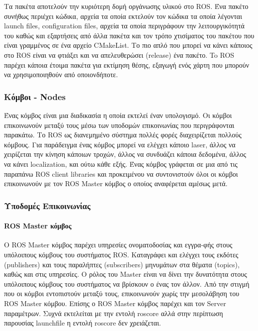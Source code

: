 Τα πακέτα αποτελούν την κυριότερη δομή οργάνωσης υλικού στο ROS. Ένα πακέτο συνήθως περιέχει κώδικα, αρχεία τα οποία εκτελούν τον κώδικα τα οποία λέγονται launch files, configuration files, αρχεία τα οποία περιγράφουν την λειτουργικότητά του καθώς και εξαρτήσεις από άλλα πακέτα και τον τρόπο χτισίματος του πακέτου που είναι γραμμένος σε ένα αρχείο CMakeList. Το πιο απλό που μπορεί να κάνει κάποιος στο ROS είναι να φτιάξει και να απελευθερώσει (release) ένα πακέτο. To ROS παρέχει κάποια έτοιμα πακέτα για εκτίμηση θέσης, εξαγωγή ενός χάρτη που μπορούν να χρησιμοποιηθούν από οποιονδήποτε.
 
\subsubsection{Κόμβοι - Nodes} 

Ένας κόμβος είναι μια διαδικασία η οποία εκτελεί έναν υπολογισμό. Οι κόμβοι επικοινωνούν μεταξύ τους μέσω των υποδομών επικοινωνίας που περιγράφονται παρακάτω. Το ROS ως διανεμημένο σύστημα πολλές φορές διαχειρίζεται πολλούς κόμβους. Για παράδειγμα ένας κόμβος μπορεί να ελέγχει κάποιο laser, άλλος να χειρίζεται την κίνηση κάποιων τροχών, άλλος να συνδυάζει κάποια δεδομένα, άλλος να κάνει localization, και ούτω κάθε εξής. Ένας κόμβος γράφεται σε μια από τις παραπάνω ROS client libraries	και προκειμένου να συντονιστούν όλοι οι κόμβοι επικοινωνούν με τον ROS Master κόμβος ο οποίος αναφέρεται αμέσως μετά.  
 
\subsubsection{Υποδομές Επικοινωνίας} 

\paragraph{ROS Master κόμβος}
Ο ROS Master κόμβος παρέχει υπηρεσίες ονοματοδοσίας και εγγρα-φής στους υπόλοιπους κόμβους του συστήματος ROS. Καταγράφει και ελέγχει τους εκδότες (publishers) και τους παραλήπτες (subscribers) μηνυμάτων στα θέματα (topics), καθώς και στις υπηρεσίες. Ο ρόλος του Master είναι να δίνει την δυνατότητα στους υπόλοιπους κόμβους του συστήματος να βρίσκουν ο ένας τον άλλον. Από την στιγμή που οι κόμβοι εντοπιστούν μεταξύ τους, επικοινωνούν χωρίς την μεσολάβηση του ROS Master κόμβου. Επίσης ο ROS Master κόμβος παρέχει και τον Server παραμέτρων. Συχνά εκτελείται με την εντολή roscore αλλά στην περίπτωση παρουσίας launchfile η εντολή roscore δεν χρειάζεται.

